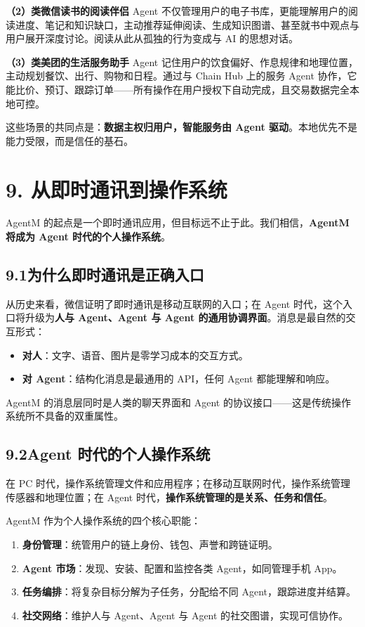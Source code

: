 \documentclass[11pt,a4paper]{article}
\begin{document}
\textbf{（2）类微信读书的阅读伴侣}
Agent 不仅管理用户的电子书库，更能理解用户的阅读进度、笔记和知识缺口，主动推荐延伸阅读、生成知识图谱、甚至就书中观点与用户展开深度讨论。阅读从此从孤独的行为变成与 AI 的思想对话。

\textbf{（3）类美团的生活服务助手}
Agent 记住用户的饮食偏好、作息规律和地理位置，主动规划餐饮、出行、购物和日程。通过与 Chain Hub 上的服务 Agent 协作，它能比价、预订、跟踪订单——所有操作在用户授权下自动完成，且交易数据完全本地可控。

这些场景的共同点是：\textbf{数据主权归用户，智能服务由 Agent 驱动}。本地优先不是能力受限，而是信任的基石。

\section{9. 从即时通讯到操作系统}

AgentM 的起点是一个即时通讯应用，但目标远不止于此。我们相信，\textbf{AgentM 将成为 Agent 时代的个人操作系统}。

\subsection{9.1\quad 为什么即时通讯是正确入口}

从历史来看，微信证明了即时通讯是移动互联网的入口；在 Agent 时代，这个入口将升级为\textbf{人与 Agent、Agent 与 Agent 的通用协调界面}。消息是最自然的交互形式：
\begin{itemize}[leftmargin=2em]
  \item \textbf{对人}：文字、语音、图片是零学习成本的交互方式。
  \item \textbf{对 Agent}：结构化消息是最通用的 API，任何 Agent 都能理解和响应。
\end{itemize}

AgentM 的消息层同时是人类的聊天界面和 Agent 的协议接口——这是传统操作系统所不具备的双重属性。

\subsection{9.2\quad Agent 时代的个人操作系统}

在 PC 时代，操作系统管理文件和应用程序；在移动互联网时代，操作系统管理传感器和地理位置；在 Agent 时代，\textbf{操作系统管理的是关系、任务和信任}。

AgentM 作为个人操作系统的四个核心职能：

\begin{enumerate}[leftmargin=2em]
  \item \textbf{身份管理}：统管用户的链上身份、钱包、声誉和跨链证明。
  \item \textbf{Agent 市场}：发现、安装、配置和监控各类 Agent，如同管理手机 App。
  \item \textbf{任务编排}：将复杂目标分解为子任务，分配给不同 Agent，跟踪进度并结算。
  \item \textbf{社交网络}：维护人与 Agent、Agent 与 Agent 的社交图谱，实现可信协作。
\end{enumerate}
\end{document}
